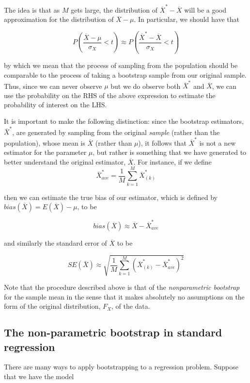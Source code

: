 The idea is that as $M$ gets large, the distribution of $\overline{X}^* - \overline{X}$ will be a good approximation for the distribution of $\overline{X} -\mu$. In particular, we should have that

$$P\left(\frac{ \overline{X} - \mu}{\sigma_X} < t \right) \approx P\left(\frac{ \overline{X}^* - \overline{X}}{\sigma_X} < t \right)$$


by which we mean that the process of sampling from the population should be comparable to the process of taking a bootstrap sample from our original sample. Thus, since we can never observe $\mu$ but we do observe both $\overline{X}^*$ and $\overline{X}$, we can use the probability on the RHS of the above expression to estimate the probability of interest on the LHS.

It is important to make the following distinction: since the bootstrap estimators, $\overline{X}^*$, are generated by sampling from the original \textit{sample} (rather than the population), whose mean is $\overline{X}$ (rather than $\mu$), it follows that $\overline{X}^*$ is not a new estimator for the parameter $\mu$, but rather is something that we have generated to better understand the original estimator, $\overline{X}$. For instance, if we define 
$$ \overline{X}_{ave}^* = \frac{1}{M} \sum_{k=1}^M \overline{X}_{(k)}^*$$ 

then we can estimate the true bias of our estimator, which is defined by $bias(\overline{X}) = E\left(\overline{X}\right) - \mu$, to be

$$bias(\overline{X}) \approx \overline{X} - \overline{X}_{ave}^*$$

and similarly the standard error of $\overline{X}$ to be

$$SE(\bar{X}) \approx \sqrt{\frac{1}{M} \sum_{k=1}^M \left( \overline{X}_{(k)}^* - \overline{X}_{ave}^*\right)^2}$$

Note that the procedure described above is that of the \textit{nonparametric bootstrap} for the sample mean in the sense that it makes absolutely no assumptions on the form of the original distribution, $F_X$, of the data. 


\subsection*{The non-parametric bootstrap in standard regression}

There are many ways to apply bootstrapping to a regression problem. Suppose that we have the model

